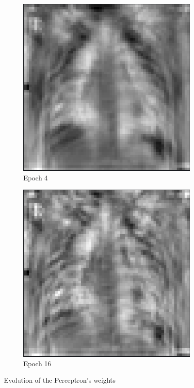 \documentclass{article}
\begin{document}
\begin{figure}[hbt!]
\medskip %
\begin{subfigure}{.3\linewidth}
  \includegraphics[width=\linewidth]{assets/perceptron/training-1-epoch-4.png}
  \caption{Epoch 4}
  \label{training-1-epoch-4}
\end{subfigure}
\begin{subfigure}{.3\linewidth}
  \includegraphics[width=\linewidth]{assets/perceptron/training-1-epoch-16.png}
  \caption{Epoch 16}
  \label{training-1-epoch-16}
\end{subfigure}

\caption*{Evolution of the Perceptron's weights}
\label{fig:roc}
\end{figure}
\end{document}
